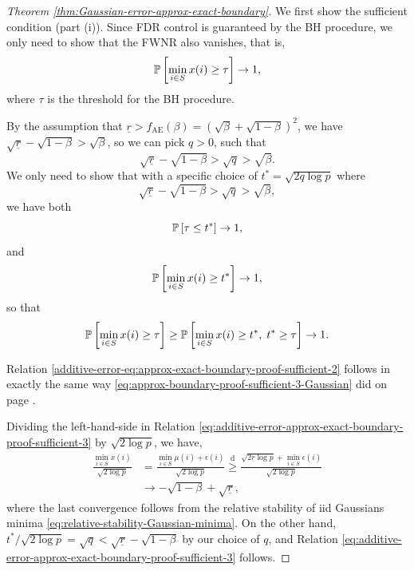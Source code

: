 \begin{proof}[Theorem \ref{thm:Gaussian-error-approx-exact-boundary}]
We first show the sufficient condition (part {\rm (i)}).
Since FDR control is guaranteed by the BH procedure, we only need to show that the FWNR also vanishes, that is,
\begin{equation} \label{eq:approx-exact-boundary-proof-sufficient-1-Gaussian}
    \P\left[\min_{i\in S}x(i) \ge \tau\right] \to 1,
\end{equation}
where $\tau$ is the threshold for the BH procedure.

By the assumption that $\underline{r}>f_{\mathrm{AE}}(\beta)=(\sqrt{\beta}+\sqrt{1-\beta})^2$, we have $\sqrt{\underline{r}}-\sqrt{1-\beta}>\sqrt{\beta}$, so we can pick $q>0$, such that 
\begin{equation} \label{eq:approx-exact-boundary-proof-sufficient-2-Gaussian}
\sqrt{\underline{r}}-\sqrt{1-\beta}>\sqrt{q}>\sqrt{\beta}.
\end{equation}
We only need to show that with a specific choice of $t^*=\sqrt{2q\log{p}}$ where
\begin{equation} \label{eq:additive-error-approx-exact-boundary-proof-sufficient-1}
\sqrt{\underline{r}}-\sqrt{1-\beta}>\sqrt{q}>\sqrt{\beta},
\end{equation}
we have both
\begin{equation} \label{additive-error-eq:approx-exact-boundary-proof-sufficient-2}
\P\left[\tau\le t^*\right]\to 1,
\end{equation}
and 
\begin{equation} \label{eq:additive-error-approx-exact-boundary-proof-sufficient-3}
    \P\left[\min_{i\in S}x(i) \ge t^* \right] \to 1,
\end{equation}
so that 
\begin{equation*} 
    \P\left[\min_{i\in S}x(i) \ge \tau\right] \ge 
    \P\left[\min_{i\in S}x(i) \ge t^*,\; t^* \ge \tau\right] \to 1.
\end{equation*}

Relation \eqref{additive-error-eq:approx-exact-boundary-proof-sufficient-2} follows in exactly the same way \eqref{eq:approx-boundary-proof-sufficient-3-Gaussian} did on page  \pageref{eq:approx-boundary-proof-sufficient-3-Gaussian}.

Dividing the left-hand-side in Relation \eqref{eq:additive-error-approx-exact-boundary-proof-sufficient-3} by $\sqrt{2\log{p}}$, we have,
\begin{align*}
    \frac{\min_{i\in S}x(i)}{\sqrt{2\log{p}}} 
    &= \frac{\min_{i\in S}\mu(i)+\epsilon(i)}{\sqrt{2\log{p}}} 
    \stackrel{\mathrm{d}}{\ge} \frac{\sqrt{2\underline{r}\log{p}} + \min_{i\in S}\epsilon(i)}{\sqrt{2\log{p}}} \\
    &\to -\sqrt{1-\beta} + \sqrt{\underline{r}},
\end{align*}
where the last convergence follows from the relative stability of iid Gaussians minima \eqref{eq:relative-stability-Gaussian-minima}. 
On the other hand, ${t^*}/{\sqrt{2\log{p}}}=\sqrt{q}<\sqrt{\underline{r}}-\sqrt{1-\beta}$ by our choice of ${q}$, and Relation \eqref{eq:additive-error-approx-exact-boundary-proof-sufficient-3} follows.



\end{proof}
